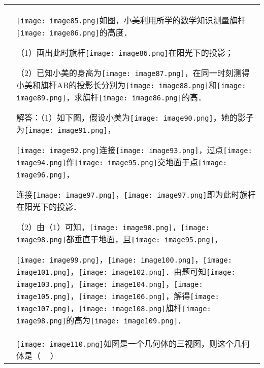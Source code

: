 \begin{longtable}[]{@{}ll@{}}
\toprule
\endhead
\begin{minipage}[t]{0.47\columnwidth}\raggedright
\strut
\end{minipage} & \begin{minipage}[t]{0.47\columnwidth}\raggedright
\texttt{[image: image85.png]}如图，小美利用所学的数学知识测量旗杆\texttt{[image: image86.png]}的高度．

（1）画出此时旗杆\texttt{[image: image86.png]}在阳光下的投影；

（2）已知小美的身高为\texttt{[image: image87.png]}，在同一时刻测得小美和旗杆AB的投影长分别为\texttt{[image: image88.png]}和\texttt{[image: image89.png]}，求旗杆\texttt{[image: image86.png]}的高．

解答：（1）如下图，假设小美为\texttt{[image: image90.png]}，她的影子为\texttt{[image: image91.png]}，

\texttt{[image: image92.png]}连接\texttt{[image: image93.png]}，过点\texttt{[image: image94.png]}作\texttt{[image: image95.png]}交地面于点\texttt{[image: image96.png]}，

连接\texttt{[image: image97.png]}，\texttt{[image: image97.png]}即为此时旗杆在阳光下的投影．

（2）由（1）可知，\texttt{[image: image90.png]}，\texttt{[image: image98.png]}都垂直于地面，且\texttt{[image: image95.png]}，

\texttt{[image: image99.png]}，\texttt{[image: image100.png]}，\texttt{[image: image101.png]}，\texttt{[image: image102.png]}．由题可知\texttt{[image: image103.png]}，\texttt{[image: image104.png]}，\texttt{[image: image105.png]}，\texttt{[image: image106.png]}，解得\texttt{[image: image107.png]}，\texttt{[image: image108.png]}旗杆\texttt{[image: image98.png]}的高为\texttt{[image: image109.png]}．\strut
\end{minipage}\tabularnewline
\begin{minipage}[t]{0.47\columnwidth}\raggedright
\strut
\end{minipage} & \begin{minipage}[t]{0.47\columnwidth}\raggedright
\texttt{[image: image110.png]}如图是一个几何体的三视图，则这个几何体是（
~ ）


\end{minipage}
\end{longtable}
